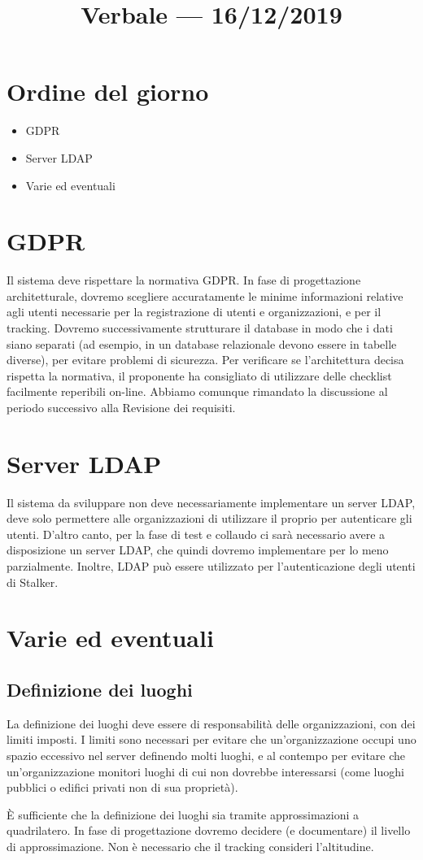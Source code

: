 \documentclass{article}
\title{Verbale --- 16/12/2019}
\begin{document}

\section{Ordine del giorno}%
\label{sec:ordine_del_giorno}

\begin{itemize}
  \item GDPR
  \item Server LDAP
  \item Varie ed eventuali
\end{itemize}
\section{GDPR}%
\label{sec:gdpr}
Il sistema deve rispettare la normativa GDPR\@.
In fase di progettazione architetturale, dovremo scegliere accuratamente le minime informazioni relative agli utenti necessarie per la registrazione di utenti e organizzazioni, e per il tracking.
Dovremo successivamente strutturare il database in modo che i dati siano separati (ad esempio, in un database relazionale devono essere in tabelle diverse), per evitare problemi di sicurezza.
Per verificare se l'architettura decisa rispetta la normativa, il proponente ha consigliato di utilizzare delle checklist facilmente reperibili on-line.
Abbiamo comunque rimandato la discussione al periodo successivo alla Revisione dei requisiti.
\section{Server LDAP}%
\label{sec:server_ldap}
Il sistema da sviluppare non deve necessariamente implementare un server LDAP, deve solo permettere alle organizzazioni di utilizzare il proprio per autenticare gli utenti.
D'altro canto, per la fase di test e collaudo ci sarà necessario avere a disposizione un server LDAP, che quindi dovremo implementare per lo meno parzialmente.
Inoltre, LDAP può essere utilizzato per l'autenticazione degli utenti di Stalker.
\section{Varie ed eventuali}%
\label{sec:varie_ed_eventuali}
\subsection{Definizione dei luoghi}%
\label{sub:definizione_dei_luoghi}
La definizione dei luoghi deve essere di responsabilità delle organizzazioni, con dei limiti imposti.
I limiti sono necessari per evitare che un'organizzazione occupi uno spazio eccessivo nel server definendo molti luoghi, e al contempo per evitare che un'organizzazione monitori luoghi di cui non dovrebbe interessarsi (come luoghi pubblici o edifici privati non di sua proprietà).\par
È sufficiente che la definizione dei luoghi sia tramite approssimazioni a quadrilatero.
In fase di progettazione dovremo decidere (e documentare) il livello di approssimazione. Non è necessario che il tracking consideri l'altitudine.
\end{document}
